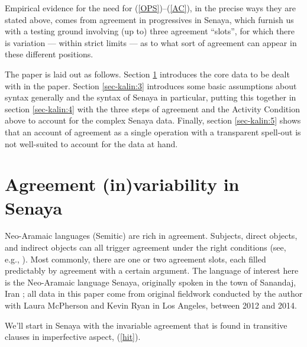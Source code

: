 \documentclass[output=paper
,modfonts
,nonflat]{langsci/langscibook}
\begin{document}
\noindent Empirical evidence for the need for (\ref{OPS})--(\ref{AC}), in the precise ways they are stated above, comes from agreement in progressives in Senaya, which furnish us with a testing ground involving (up to) three agreement ``slots'', for which there is variation --- within strict limits --- as to what sort of agreement can appear in these different positions.

The paper is laid out as follows. Section \ref{sec-kalin:2} introduces the core data to be dealt with in the paper. Section \ref{sec-kalin:3} introduces some basic assumptions about syntax generally and the syntax of Senaya in particular, putting this together in section \ref{sec-kalin:4} with the three steps of agreement and the Activity Condition above to account for the complex Senaya data. Finally, section \ref{sec-kalin:5} shows that an account of agreement as a single operation with a transparent spell-out is not well-suited to account for the data at hand.

\section{Agreement (in)variability in Senaya} \label{sec-kalin:2}

Neo-Aramaic languages (Semitic) are rich in agreement. Subjects, direct objects, and indirect objects can all trigger agreement under the right conditions (see, e.g., \citealt{DoronKhan12,KalinvanUrk15}). Most commonly, there are one or two agreement slots, each filled predictably by agreement with a certain argument. The language of interest here is the Neo-Aramaic language Senaya, originally spoken in the town of Sanandaj, Iran \citep{Panoussi90}; all data in this paper come from original fieldwork conducted by the author with Laura McPherson and Kevin Ryan in Los Angeles, between 2012 and 2014.

We'll start in Senaya with the invariable agreement that is found in transitive clauses in imperfective aspect, (\ref{hit}).

\eal \label{hit}
\zl
\end{document}
